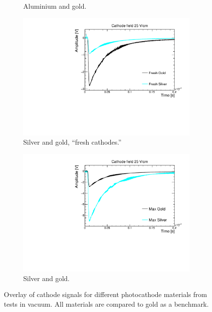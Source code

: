 \documentclass[a4paper,11pt]{article}
\begin{document}
\begin{figure}[tb]
\begin{subfigure}[h]{0.49\textwidth}
        \caption{Aluminium and gold.}
        \label{fig:aluminium}
    \end{subfigure}
    \hfill
    \begin{subfigure}[h]{0.49\textwidth}\centering\centering\captionsetup{singlelinecheck = false, format= hang, justification=raggedright, font=footnotesize, labelsep=space}
            \includegraphics[width=.99\linewidth]{figures/FirstSilverVSGold_25Vcm.pdf}
        \caption{Silver and gold, ``fresh cathodes.''}
        \label{fig:freshSilver}
    \end{subfigure}
    \hfill
    \begin{subfigure}[h]{0.49\textwidth}\centering\centering\captionsetup{singlelinecheck = false, format= hang, justification=raggedright, font=footnotesize, labelsep=space}
            \includegraphics[width=.99\linewidth]{figures/MaxSilverVSGold_25Vcm.pdf}
        \caption{Silver and gold.}
        \label{fig:maxSilver}
    \end{subfigure}
    \caption{Overlay of cathode signals for different photocathode materials from tests in vacuum. All materials are compared to gold as a benchmark.}
\end{figure}
\end{document}
